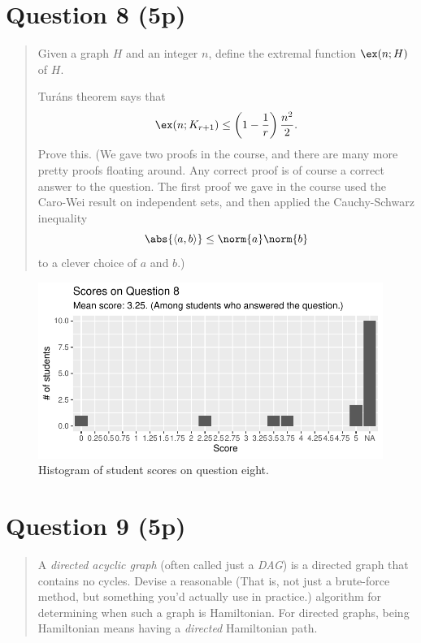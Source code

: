 \documentclass[nobib]{tufte-handout}
\begin{document}
\section{Question 8 (5p)} %

\begin{quotation}
  Given a graph $H$ and an integer $n$, define the extremal function $\ex(n; H)$ of $H$.

  Turáns theorem says that
  $$\ex(n; K_{r+1}) \leq \left(1 - \frac{1}{r}\right)\frac{n^2}{2}.$$
  Prove this. (We gave two proofs in the course, and there are many more pretty proofs floating around. Any correct proof is of course a correct answer to the question. The first proof we gave in the course used the Caro-Wei result on independent sets, and then applied the Cauchy-Schwarz inequality
  $$\abs{\langle a, b \rangle} \leq \norm{a}\norm{b}$$
  to a clever choice of $a$ and $b$.)
\end{quotation}

\begin{figure}[p]
  \centering
  \includegraphics[width = \textwidth]{Q8.pdf}
  \caption[Score histogram for Q8]{Histogram of student scores on question eight.}
  \label{fig:Q8}
\end{figure}

\section{Question 9 (5p)} %

\begin{quotation}
  A \emph{directed acyclic graph} (often called just a \emph{DAG}) is a directed graph that contains no cycles. Devise a reasonable (That is, not just a brute-force method, but something you'd actually use in practice.) algorithm for determining when such a graph is Hamiltonian. For directed graphs, being Hamiltonian means having a \emph{directed} Hamiltonian path.
\end{quotation}
\end{document}
